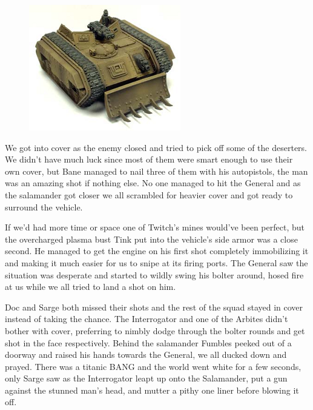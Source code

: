 \begin{figure}
	\begin{center}
		\includegraphics[width=\figwidth]{pics/9/34.png}
	\end{center}
\end{figure}
We got into cover as the enemy closed and tried to pick off some of the deserters. 
We didn't have much luck since most of them were smart enough to use their own cover, but Bane managed to nail three of them with his autopistols, the man was an amazing shot if nothing else. 
No one managed to hit the General and as the salamander got closer we all scrambled for heavier cover and got ready to surround the vehicle.

If we'd had more time or space one of Twitch's mines would've been perfect, but the overcharged plasma bust Tink put into the vehicle's side armor was a close second. 
He managed to get the engine on his first shot completely immobilizing it and making it much easier for us to snipe at its firing ports. 
The General saw the situation was desperate and started to wildly swing his bolter around, hosed fire at us while we all tried to land a shot on him. 


Doc and Sarge both missed their shots and the rest of the squad stayed in cover instead of taking the chance. 
The Interrogator and one of the Arbites didn't bother with cover, preferring to nimbly dodge through the bolter rounds and get shot in the face respectively. 
Behind the salamander Fumbles peeked out of a doorway and raised his hands towards the General, we all ducked down and prayed. 
There was a titanic BANG and the world went white for a few seconds, only Sarge saw as the Interrogator leapt up onto the Salamander, put a gun against the stunned man's head, and mutter a pithy one liner before blowing it off.

